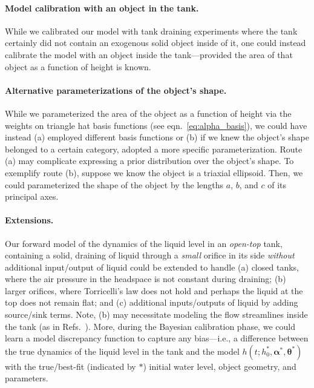 \documentclass[openacc]{rsproca_new}%
\begin{document}
\paragraph{Model calibration with an object in the tank.}
While we calibrated our model with tank draining experiments where the tank certainly did not contain an exogenous solid object inside of it, one could instead calibrate the model with an object inside the tank---provided the area of that object as a function of height is known. 

\paragraph{Alternative parameterizations of the object's shape.}
While we parameterized the area of the object as a function of height via the weights on triangle hat basis functions (see eqn.~\ref{eq:alpha_basis}), we could have instead (a) employed different basis functions or (b) if we knew the object's shape belonged to a certain category, adopted a more specific parameterization.
Route (a) may complicate expressing a prior distribution over the object's shape. 
To exemplify route (b), suppose we know the object is a triaxial ellipsoid. Then, we could parameterized the shape of the object by the lengths $a$, $b$, and $c$ of its principal axes.

\paragraph{Extensions.}
Our forward model of the dynamics of the liquid level in an \emph{open-top} tank, containing a solid, draining of liquid through a \emph{small} orifice in its side \emph{without} additional input/output of liquid could be extended to handle 
(a) closed tanks, where the air pressure in the headspace is not constant during draining; 
(b) larger orifices, where Torricelli's law does not hold and perhaps the liquid at the top does not remain flat;
and
(c) additional inputs/outputs of liquid by adding source/sink terms.
Note, (b) may necessitate modeling the flow streamlines inside the tank (as in Refs.~\cite{mathew2014numerical,sakri2017numerical}).
More, during the Bayesian calibration phase, we could learn a model discrepancy \cite{brynjarsdottir2014learning,kennedy2001bayesian} function to capture any bias---i.e., a difference between the true dynamics of the liquid level in the tank and the model $h(t; h_0^*,  \boldsymbol \alpha^*, \boldsymbol \theta^*)$ with the true/best-fit (indicated by $*$) initial water level, object geometry, and parameters.






\enlargethispage{20pt}



\vskip2pc



\end{document}
